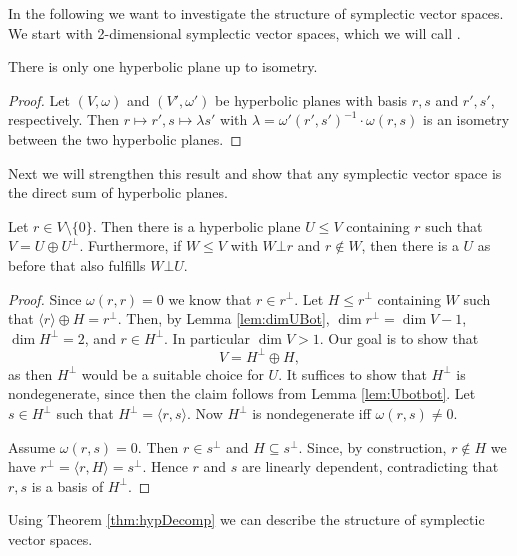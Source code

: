 In the following we want to investigate the structure of symplectic vector spaces.
We start with 2-dimensional symplectic vector spaces, which we will call .
		
		
\begin{lemma}\label{lem:oneHypPlane}
	There is only one hyperbolic plane up to isometry.
\end{lemma}
\begin{proof}
	Let $(V,\omega)$ and $(V',\omega')$ be hyperbolic planes with basis $r,s$ and $r',s'$, respectively. 
	Then $r\mapsto r', s\mapsto \lambda s'$ with $\lambda=\omega'(r',s')^{-1}\cdot\omega(r,s)$ is an isometry between the two hyperbolic planes. 
\end{proof}
Next we will strengthen this result and show that any symplectic vector space is the direct sum of hyperbolic planes.
		
\begin{theorem}\label{thm:hypDecomp}
	Let $r\in V\setminus\{0\}$. Then there is a hyperbolic plane $U\leq V$ containing $r$ such that $V=U\oplus U^\bot$. Furthermore, if $W\leq V$ with $W\bot r$ and $r\notin W$, then there is a $U$ as before that also fulfills $W\bot U$.
\end{theorem}
\begin{proof}
	Since $\omega(r,r)=0$ we know that $r\in r^\bot$. Let $H\leq r^\bot$ containing $W$ such that $\langle r\rangle\oplus H=r^\bot$. Then, by Lemma \ref{lem:dimUBot}, $\dim r^\bot=\dim V-1$, $\dim H^\bot=2$, and $r\in H^\bot$. In particular $\dim V>1$.
	Our goal is to show that \[V=H^\bot\oplus H,\] as then $H^\bot$ would be a suitable choice for $U$.
	It suffices to show that $H^\bot$ is nondegenerate, since then the claim follows from Lemma \ref{lem:Ubotbot}. Let $s\in H^\bot$ such that $H^\bot=\langle r,s\rangle$. Now $H^\bot$ is nondegenerate iff $\omega(r,s)\not=0$. 
				
	Assume $\omega(r,s)=0$. Then $r\in s^\bot$ and $H\subseteq s^\bot$. Since, by construction, $r\notin H$ we have $r^\bot=\langle r,H\rangle=s^\bot$. Hence $r$ and $s$ are linearly dependent, contradicting that $r,s$ is a basis of $H^\bot$.
\end{proof}
		
Using Theorem \ref{thm:hypDecomp} we can describe the structure of symplectic vector spaces.
		
